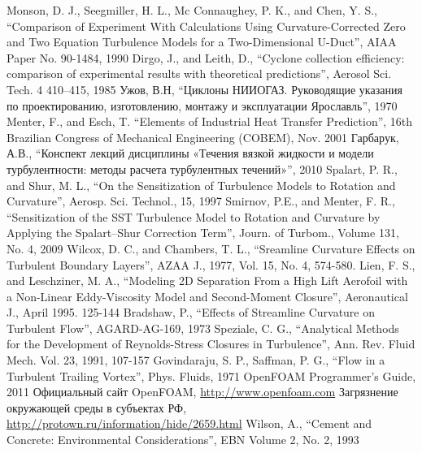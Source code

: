 \documentclass[pdftex,a4paper,12pt]{article}
\begin{document}
\newpage
\begin{thebibliography}{9}
 Monson, D. J., Seegmiller, H. L., Mc Connaughey, P. K., and Chen, Y. S., “Comparison of Experiment With Calculations Using Curvature-Corrected Zero and Two Equation Turbulence Models for a Two-Dimensional U-Duct”, AIAA Paper No. 90-1484, 1990
 Dirgo, J., and Leith, D., “Cyclone collection efficiency: comparison of experimental results with theoretical predictions”, Aerosol Sci. Tech. 4 410–415, 1985
 Ужов, В.Н, “Циклоны НИИОГАЗ. Руководящие указания по проектированию, изготовлению, монтажу и эксплуатации Ярославль”, 1970
 Menter, F., and Esch, T. “Elements of Industrial Heat Transfer Prediction”, 16th Brazilian Congress of Mechanical Engineering (COBEM), Nov. 2001
 Гарбарук, А.В., “Конспект лекций дисциплины «Течения вязкой жидкости и модели турбулентности: методы расчета турбулентных течений»”, 2010
  Spalart, P. R., and Shur, M. L., “On the Sensitization of Turbulence Models to Rotation and Curvature”, Aerosp. Sci. Technol., 15, 1997
 Smirnov, P.E., and Menter, F. R., “Sensitization of the SST Turbulence Model to Rotation and Curvature by Applying the Spalart–Shur Correction Term”, Journ. of Turbom., Volume 131, No. 4, 2009
 Wilcox, D. C., and Chambers, T. L., “Sreamline Curvature Effects on Turbulent Boundary Layers”, AZAA J., 1977, Vol. 15, No. 4, 574-580.
 Lien, F. S., and Leschziner, M. A., “Modeling 2D Separation From a High Lift Aerofoil with a Non-Linear Eddy-Viscosity Model and Second-Moment Closure”, Aeronautical J., April 1995. 125-144
 Bradshaw, P., “Effects of Streamline Curvature on Turbulent Flow”, AGARD-AG-169, 1973
 Speziale, C. G., “Analytical Methods for the Development of Reynolds-Stress Closures in Turbulence”, Ann. Rev. Fluid Mech. Vol. 23, 1991, 107-157
 Govindaraju, S. P., Saffman, P. G., “Flow in a Turbulent Trailing Vortex”, Phys. Fluids, 1971
 OpenFOAM Programmer’s Guide, 2011
 Официальный сайт OpenFOAM, \url{http://www.openfoam.com}
 Загрязнение окружающей среды в субъектах РФ, \url{http://protown.ru/information/hide/2659.html}
 Wilson, A., “Cement and Concrete: Environmental Considerations”, EBN Volume 2, No. 2, 1993
\end{thebibliography}
\end{document}
